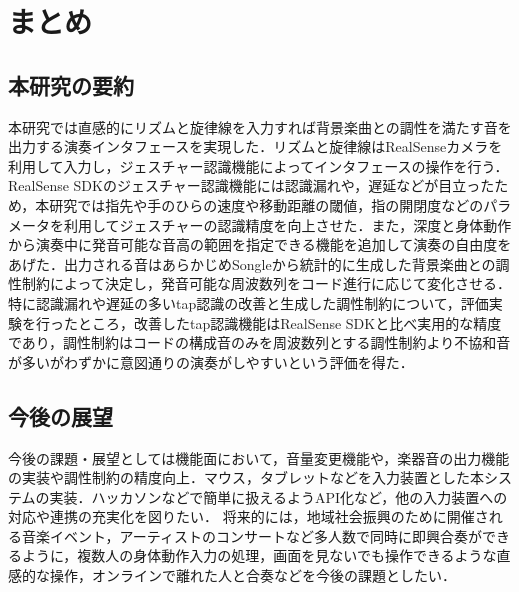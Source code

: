 \chapter{まとめ}
\section{本研究の要約}
本研究では直感的にリズムと旋律線を入力すれば背景楽曲との調性を満たす音を出力する演奏インタフェースを実現した．リズムと旋律線はRealSenseカメラを利用して入力し，ジェスチャー認識機能によってインタフェースの操作を行う．RealSense SDKのジェスチャー認識機能には認識漏れや，遅延などが目立ったため，本研究では指先や手のひらの速度や移動距離の閾値，指の開閉度などのパラメータを利用してジェスチャーの認識精度を向上させた．また，深度と身体動作から演奏中に発音可能な音高の範囲を指定できる機能を追加して演奏の自由度をあげた．出力される音はあらかじめSongleから統計的に生成した背景楽曲との調性制約によって決定し，発音可能な周波数列をコード進行に応じて変化させる．特に認識漏れや遅延の多いtap認識の改善と生成した調性制約について，評価実験を行ったところ，改善したtap認識機能はRealSense SDKと比べ実用的な精度であり，調性制約はコードの構成音のみを周波数列とする調性制約より不協和音が多いがわずかに意図通りの演奏がしやすいという評価を得た．
\section{今後の展望}
今後の課題・展望としては機能面において，音量変更機能や，楽器音の出力機能の実装や調性制約の精度向上．マウス，タブレットなどを入力装置とした本システムの実装．ハッカソンなどで簡単に扱えるようAPI化など，他の入力装置への対応や連携の充実化を図りたい．
将来的には，地域社会振興のために開催される音楽イベント，アーティストのコンサートなど多人数で同時に即興合奏ができるように，複数人の身体動作入力の処理，画面を見ないでも操作できるような直感的な操作，オンラインで離れた人と合奏などを今後の課題としたい．

